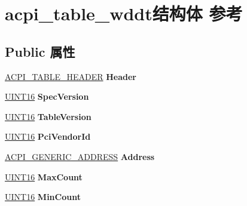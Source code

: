 \hypertarget{structacpi__table__wddt}{}\section{acpi\+\_\+table\+\_\+wddt结构体 参考}
\label{structacpi__table__wddt}
\subsection*{Public 属性}
\begin{DoxyCompactItemize}
\item 
\mbox{\label{structacpi__table__wddt_a4ab0885df3c0e3b918d59328de04e839}} 
\hyperlink{structacpi__table__header}{A\+C\+P\+I\+\_\+\+T\+A\+B\+L\+E\+\_\+\+H\+E\+A\+D\+ER} {\bfseries Header}
\item 
\mbox{\label{structacpi__table__wddt_af252f1d2cf953a649372ca72218655a3}} 
\hyperlink{_processor_bind_8h_a09f1a1fb2293e33483cc8d44aefb1eb1}{U\+I\+N\+T16} {\bfseries Spec\+Version}
\item 
\mbox{\label{structacpi__table__wddt_ae6eb35fdd875ca555313e8efa6cbbcdb}} 
\hyperlink{_processor_bind_8h_a09f1a1fb2293e33483cc8d44aefb1eb1}{U\+I\+N\+T16} {\bfseries Table\+Version}
\item 
\mbox{\label{structacpi__table__wddt_a1b47a1fad0edc653328368b39886427e}} 
\hyperlink{_processor_bind_8h_a09f1a1fb2293e33483cc8d44aefb1eb1}{U\+I\+N\+T16} {\bfseries Pci\+Vendor\+Id}
\item 
\mbox{\label{structacpi__table__wddt_ab732627a567ac72cc4c5514b1f05aa7d}} 
\hyperlink{structacpi__generic__address}{A\+C\+P\+I\+\_\+\+G\+E\+N\+E\+R\+I\+C\+\_\+\+A\+D\+D\+R\+E\+SS} {\bfseries Address}
\item 
\mbox{\label{structacpi__table__wddt_a96bcdbcf79f77c74d17c32c2948e6c3a}} 
\hyperlink{_processor_bind_8h_a09f1a1fb2293e33483cc8d44aefb1eb1}{U\+I\+N\+T16} {\bfseries Max\+Count}
\item 
\mbox{\label{structacpi__table__wddt_a8753aa057980f5737cbd79da71b69106}} 
\hyperlink{_processor_bind_8h_a09f1a1fb2293e33483cc8d44aefb1eb1}{U\+I\+N\+T16} {\bfseries Min\+Count}

\end{DoxyCompactItemize}
